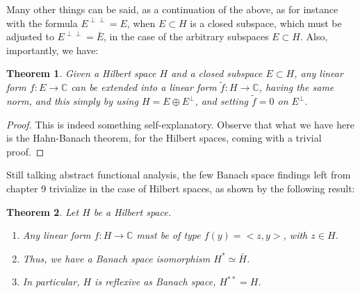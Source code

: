 \documentclass[12pt]{amsbook}
\newtheorem{theorem}{Theorem}[chapter]
\begin{document}
Many other things can be said, as a continuation of the above, as for instance with the formula $E^{\perp\perp}=E$, when $E\subset H$ is a closed subspace, which must be adjusted to $E^{\perp\perp}=\bar{E}$, in the case of the arbitrary subspaces $E\subset H$. Also, importantly, we have:

\begin{theorem}
Given a Hilbert space $H$ and a closed subspace $E\subset H$, any linear form $f:E\to\mathbb C$ can be extended into a linear form $\tilde{f}:H\to\mathbb C$, having the same norm, and this simply by using $H=E\oplus E^\perp$, and setting $\tilde{f}=0$ on $E^\perp$.
\end{theorem}

\begin{proof}
This is indeed something self-explanatory. Observe that what we have here is the Hahn-Banach theorem, for the Hilbert spaces, coming with a trivial proof.
\end{proof}

Still talking abstract functional analysis, the few Banach space findings left from chapter 9 trivialize in the case of Hilbert spaces, as shown by the following result:

\begin{theorem}
Let $H$ be a Hilbert space.
\begin{enumerate}
\item Any linear form $f:H\to\mathbb C$ must be of type $f(y)=<z,y>$, with $z\in H$. 

\item Thus, we have a Banach space isomorphism $H^*\simeq\bar{H}$.

\item In particular, $H$ is reflexive as Banach space, $H^{**}=H$.
\end{enumerate}
\end{theorem}
\end{document}
